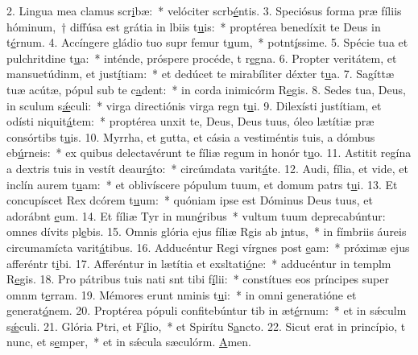 2. Lingua mea clamus scr\uline{i}bæ:~* velóciter scrb\uline{é}ntis.
3. Speciósus forma præ fíliis hóminum,~† diffúsa est grátia in lbiis t\uline{u}is:~* proptérea benedíxit te Deus in t\uline{é}rnum.
4. Accíngere gládio tuo supr femur t\uline{u}um,~* potnt\uline{í}ssime.
5. Spécie tua et pulchritdine t\uline{u}a:~* inténde, próspere procéde, t r\uline{e}gna.
6. Propter veritátem, et mansuetúdinm, et just\uline{í}tiam:~* et dedúcet te mirabíliter déxter t\uline{u}a.
7. Sagíttæ tuæ acútæ, pópul sub te c\uline{a}dent:~* in corda inimicórm R\uline{e}gis.
8. Sedes tua, Deus, in sculum s\uline{ǽ}culi:~* virga directiónis virga regn t\uline{u}i.
9. Dilexísti justítiam, et odísti niquit\uline{á}tem:~* proptérea unxit te, Deus, Deus tuus, óleo lætítiæ præ consórtibs t\uline{u}is.
10. Myrrha, et gutta, et cásia a vestiméntis tuis, a dómbus eb\uline{ú}rneis:~* ex quibus delectavérunt te fíliæ regum in honór t\uline{u}o.
11. Astitit regína a dextris tuis in vestít deaur\uline{á}to:~* circúmdata varit\uline{á}te.
12. Audi, fília, et vide, et inclín aurem t\uline{u}am:~* et oblivíscere pópulum tuum, et domum patrs t\uline{u}i.
13. Et concupíscet Rex dcórem t\uline{u}um:~* quóniam ipse est Dóminus Deus tuus, et adorábnt \uline{e}um.
14. Et fíliæ Tyr in mun\uline{é}ribus~* vultum tuum deprecabúntur: omnes dívits pl\uline{e}bis.
15. Omnis glória ejus fíliæ Rgis ab \uline{i}ntus,~* in fímbriis áureis circumamícta varit\uline{á}tibus.
16. Adducéntur Regi vírgnes post \uline{e}am:~* próximæ ejus afferéntr t\uline{i}bi.
17. Afferéntur in lætítia et exsltati\uline{ó}ne:~* adducéntur in templm R\uline{e}gis.
18. Pro pátribus tuis nati snt tibi f\uline{í}lii:~* constítues eos príncipes super omnm t\uline{e}rram.
19. Mémores erunt nminis t\uline{u}i:~* in omni generatióne et generat\uline{ó}nem.
20. Proptérea pópuli confitebúntur tib in æt\uline{é}rnum:~* et in sǽculm s\uline{ǽ}culi.
21. Glória Ptri, et F\uline{í}lio,~* et Spirítu S\uline{a}ncto.
22. Sicut erat in princípio, t nunc, et s\uline{e}mper,~* et in sǽcula sæculórm. \uline{A}men.
